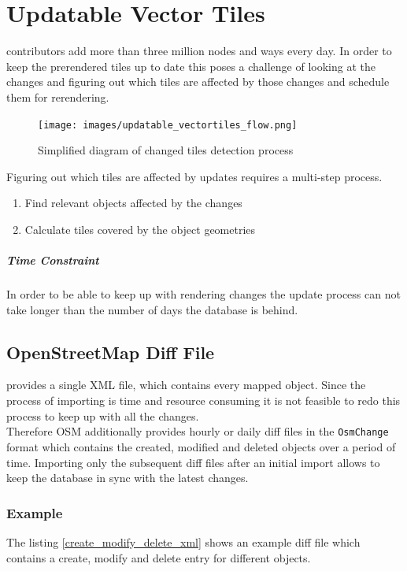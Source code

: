 \chapter{Updatable Vector Tiles}\label{chapter_updatable_vector_tiles}


\osm{} contributors add more than three million nodes and ways every day.
In order to keep the prerendered tiles up to date this poses a challenge of looking at the changes
and figuring out which tiles are affected by those changes and schedule them for rerendering.

\begin{figure}[H]
  \centering
  \texttt{[image: images/updatable\_vectortiles\_flow.png]}
  \caption{Simplified diagram of changed tiles detection process}
\end{figure}

Figuring out which tiles are affected by updates requires a multi-step process.

\begin{enumerate}
    \item Find relevant \osm{} objects affected by the changes
    \item Calculate tiles covered by the object geometries
\end{enumerate}

\paragraph{Time Constraint} In order to be able to keep up with rendering changes the update process can not take longer than the number of days the database is behind.

\section{OpenStreetMap Diff File}

\osm{} provides a single XML file, which contains every mapped object. Since the process of importing is time and resource consuming it is not feasible to redo this process to keep up with all the changes. 
\\
Therefore OSM additionally provides hourly or daily diff files in the \texttt{OsmChange} format which contains the created, modified and deleted objects over a period of time. Importing only the subsequent diff files after an initial import allows to keep the database in sync with the latest changes.

\subsection*{Example}
The listing \autoref{create_modify_delete_xml} shows an example diff file which contains a create, modify and delete entry for different objects.

